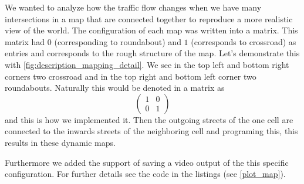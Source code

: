 We wanted to analyze how the traffic flow changes when we have many intersections in a map that are connected together to reproduce a more realistic view of the world. The configuration of each map was written into a matrix. This matrix had $0$ (corresponding to roundabout) and $1$ (corresponds to crossroad) as entries and corresponds to the rough structure of the map. Let's demonstrate this with \autoref{fig:description_mapping_detail}. We see in the top left and bottom right corners two crossroad and in the top right and bottom left corner two roundabouts. Naturally this would be denoted in a matrix as
\[
	\left(\begin{matrix}
1 & 0\\ 
0 & 1
\end{matrix}\right)
\]
and this is how we implemented it. Then the outgoing streets of the one cell are connected to the inwards streets of the neighboring cell and programing this, this results in these dynamic maps.

Furthermore we added the support of saving a video output of the this specific configuration. For further details see the code in the listings (see \autoref{plot_map}).

\newpage